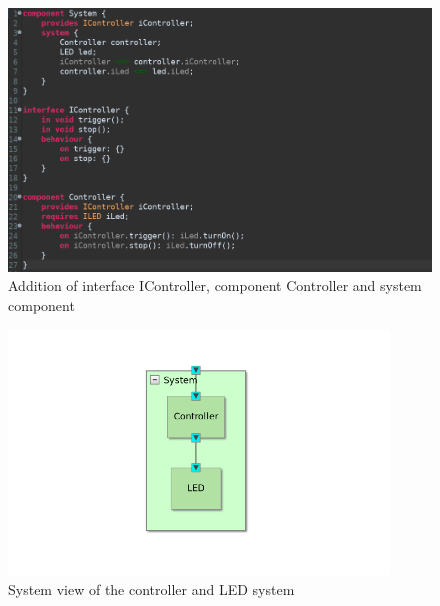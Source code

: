 \documentclass[12pt]{scrreprt}
\begin{document}
\begin{figure}[H]
    \centering
    \includegraphics[width=\textwidth]{Figures/theoretical_background/system_component.png}
    \caption{Addition of interface IController, component Controller and system component}
    \label{Addition of interface IController, component Controller and system component}
\end{figure}

\begin{figure}[H]
    \centering
    \includegraphics[width=0.9\textwidth]{Figures/theoretical_background/sys_view.png}
    \caption{System view of the controller and LED system}
    \label{System view of the controller and led system}
\end{figure}
\end{document}
